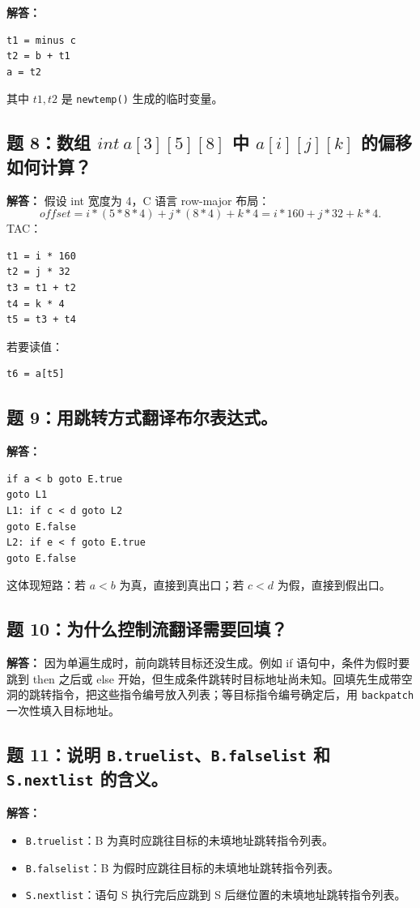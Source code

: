 \documentclass[UTF8,fontset=none,11pt]{ctexart}
\begin{document}
\textbf{解答：}
\begin{verbatim}
t1 = minus c
t2 = b + t1
a = t2
\end{verbatim}
其中 \(t1,t2\) 是 \texttt{newtemp()} 生成的临时变量。

\subsection*{题 8：数组 \texorpdfstring{\(int\ a[3][5][8]\)}{int a[3][5][8]} 中 \texorpdfstring{\(a[i][j][k]\)}{a[i][j][k]} 的偏移如何计算？}

\textbf{解答：} 假设 int 宽度为 4，C 语言 row-major 布局：
\[
offset=i*(5*8*4)+j*(8*4)+k*4=i*160+j*32+k*4.
\]
TAC：
\begin{verbatim}
t1 = i * 160
t2 = j * 32
t3 = t1 + t2
t4 = k * 4
t5 = t3 + t4
\end{verbatim}
若要读值：
\begin{verbatim}
t6 = a[t5]
\end{verbatim}

\subsection*{题 9：用跳转方式翻译布尔表达式。}

\textbf{解答：}
\begin{verbatim}
if a < b goto E.true
goto L1
L1: if c < d goto L2
goto E.false
L2: if e < f goto E.true
goto E.false
\end{verbatim}
这体现短路：若 \(a<b\) 为真，直接到真出口；若 \(c<d\) 为假，直接到假出口。

\subsection*{题 10：为什么控制流翻译需要回填？}

\textbf{解答：} 因为单遍生成时，前向跳转目标还没生成。例如 if 语句中，条件为假时要跳到 then 之后或 else 开始，但生成条件跳转时目标地址尚未知。回填先生成带空洞的跳转指令，把这些指令编号放入列表；等目标指令编号确定后，用 \texttt{backpatch} 一次性填入目标地址。

\subsection*{题 11：说明 \texttt{B.truelist}、\texttt{B.falselist} 和 \texttt{S.nextlist} 的含义。}

\textbf{解答：}

\begin{itemize}
  \item \texttt{B.truelist}：B 为真时应跳往目标的未填地址跳转指令列表。
  \item \texttt{B.falselist}：B 为假时应跳往目标的未填地址跳转指令列表。
  \item \texttt{S.nextlist}：语句 S 执行完后应跳到 S 后继位置的未填地址跳转指令列表。
\end{itemize}
\end{document}
